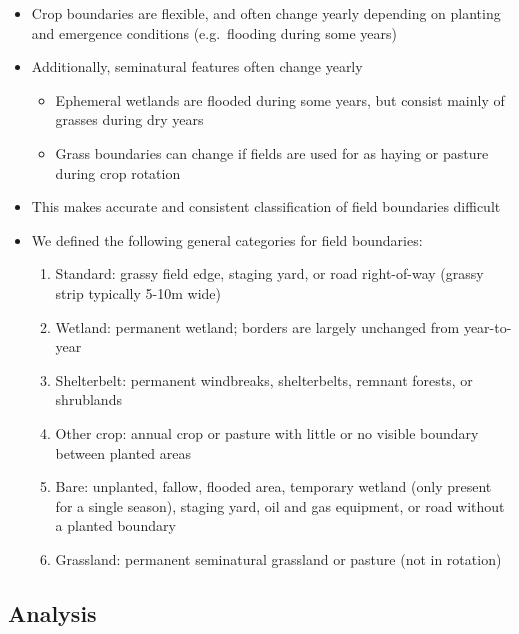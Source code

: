\documentclass[]{elsarticle} %
\providecommand{\tightlist}{%
  \setlength{\itemsep}{0pt}\setlength{\parskip}{0pt}}
\begin{document}
\begin{itemize}
  \begin{itemize}
  \tightlist
  \item
    Crop boundaries are flexible, and often change yearly depending on planting and emergence conditions (e.g.~flooding during some years)
  \item
    Additionally, seminatural features often change yearly

    \begin{itemize}
    \tightlist
    \item
      Ephemeral wetlands are flooded during some years, but consist mainly of grasses during dry years
    \item
      Grass boundaries can change if fields are used for as haying or pasture during crop rotation
    \end{itemize}
  \item
    This makes accurate and consistent classification of field boundaries difficult
  \item
    We defined the following general categories for field boundaries:

    \begin{enumerate}
    \def\labelenumi{\arabic{enumi}.}
    \tightlist
    \item
      Standard: grassy field edge, staging yard, or road right-of-way (grassy strip typically 5-10m wide)
    \item
      Wetland: permanent wetland; borders are largely unchanged from year-to-year
    \item
      Shelterbelt: permanent windbreaks, shelterbelts, remnant forests, or shrublands
    \item
      Other crop: annual crop or pasture with little or no visible boundary between planted areas
    \item
      Bare: unplanted, fallow, flooded area, temporary wetland (only present for a single season), staging yard, oil and gas equipment, or road without a planted boundary
    \item
      Grassland: permanent seminatural grassland or pasture (not in rotation)
    \end{enumerate}
  \end{itemize}
\end{itemize}

\hypertarget{analysis}{%
\subsection{Analysis}\label{analysis}}
\end{document}

